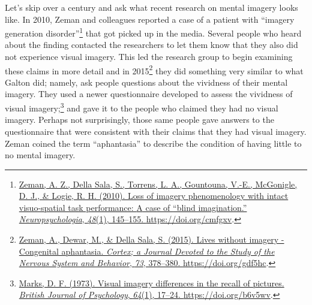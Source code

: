 \documentclass[
  oneside,
  12pt]{crumpbook}
\begin{document}
Let's skip over a century and ask what recent research on mental imagery looks like. In 2010, Zeman and colleagues reported a case of a patient with ``imagery generation disorder''\footnote{\protect\hyperlink{ref-zemanLossImageryPhenomenology2010}{Zeman, A. Z., Della Sala, S., Torrens, L. A., Gountouna, V.-E., McGonigle, D. J., \& Logie, R. H. (2010). Loss of imagery phenomenology with intact visuo-spatial task performance: {A} case of {``blind imagination.''} \emph{Neuropsychologia}, \emph{48}(1), 145--155. \url{https://doi.org/cmfgxv}}.} that got picked up in the media. Several people who heard about the finding contacted the researchers to let them know that they also did not experience visual imagery. This led the research group to begin examining these claims in more detail and in 2015\footnote{\protect\hyperlink{ref-zemanLivesImageryCongenital2015}{Zeman, A., Dewar, M., \& Della Sala, S. (2015). Lives without imagery - {Congenital} aphantasia. \emph{Cortex; a Journal Devoted to the Study of the Nervous System and Behavior}, \emph{73}, 378--380. \url{https://doi.org/gdf5hc}}.} they did something very similar to what Galton did; namely, ask people questions about the vividness of their mental imagery. They used a newer questionnaire developed to assess the vividness of visual imagery;\footnote{\protect\hyperlink{ref-marksVisualImageryDifferences1973}{Marks, D. F. (1973). Visual imagery differences in the recall of pictures. \emph{British Journal of Psychology}, \emph{64}(1), 17--24. \url{https://doi.org/b6v5wv}}.} and gave it to the people who claimed they had no visual imagery. Perhaps not surprisingly, those same people gave answers to the questionnaire that were consistent with their claims that they had visual imagery. Zeman coined the term ``aphantasia'' to describe the condition of having little to no mental imagery.
\end{document}

